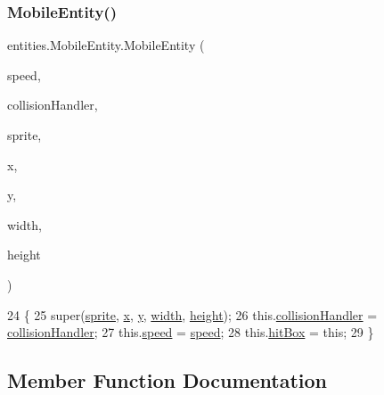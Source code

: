 \subsubsection{\texorpdfstring{Mobile\+Entity()}{MobileEntity()}}
{\footnotesize\ttfamily entities.\+Mobile\+Entity.\+Mobile\+Entity (\begin{DoxyParamCaption}\item[{float}]{speed,  }\item[{\mbox{\hyperlink{classentities_1_1_collision_handler}{Collision\+Handler}}}]{collision\+Handler,  }\item[{\mbox{\hyperlink{classorg_1_1newdawn_1_1slick_1_1_image}{Image}}}]{sprite,  }\item[{float}]{x,  }\item[{float}]{y,  }\item[{float}]{width,  }\item[{float}]{height }\end{DoxyParamCaption})\hspace{0.3cm}{\ttfamily [inline]}}


\begin{DoxyCode}
24                                                                                                            
                              \{
25         super(\mbox{\hyperlink{classentities_1_1_physical_entity_aeb439b2308ab19fb6d3ff6be6f7cdbd8}{sprite}}, \mbox{\hyperlink{classorg_1_1newdawn_1_1slick_1_1geom_1_1_shape_a3e985bfff386c15a4efaad03d8ad60d3}{x}}, \mbox{\hyperlink{classorg_1_1newdawn_1_1slick_1_1geom_1_1_shape_a9f934baded6a1b65ebb69e7e5f80ea00}{y}}, \mbox{\hyperlink{classorg_1_1newdawn_1_1slick_1_1geom_1_1_rectangle_a967e1823f62daf45abb142779d1be62d}{width}}, \mbox{\hyperlink{classorg_1_1newdawn_1_1slick_1_1geom_1_1_rectangle_a3bd010fdce636fc11ed0e0ad4d4b4a0a}{height}});
26         this.\mbox{\hyperlink{classentities_1_1_mobile_entity_a29fbe797671b1fc81eafe1e48fdc46f9}{collisionHandler}} = \mbox{\hyperlink{classentities_1_1_mobile_entity_a29fbe797671b1fc81eafe1e48fdc46f9}{collisionHandler}};
27         this.\mbox{\hyperlink{classentities_1_1_mobile_entity_a815a9d2b23a0bb7e3ee7739d4c10d7c3}{speed}} = \mbox{\hyperlink{classentities_1_1_mobile_entity_a815a9d2b23a0bb7e3ee7739d4c10d7c3}{speed}};
28         this.\mbox{\hyperlink{classentities_1_1_mobile_entity_a996d583dcbf4fd5609e14ec87dbfa7a6}{hitBox}} = \textcolor{keyword}{this};
29     \}
\end{DoxyCode}


\subsection{Member Function Documentation}
\mbox{\label{classentities_1_1_mobile_entity_af199b48458492a960d53a5a7c7685552}} 

